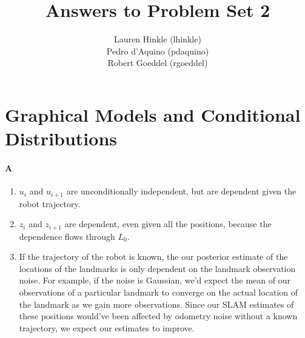 \documentclass[12pt]{article}
\title{Answers to Problem Set 2}
\author{
	Lauren Hinkle (lhinkle)\\
	Pedro d'Aquino  (pdaquino)\\
	Robert Goeddel (rgoeddel)}
\begin{document}
\maketitle
\pagebreak

\section{Graphical Models and Conditional Distributions}

\paragraph{A}
\begin{enumerate}
	\item $u_i$ and $u_{i+1}$ are unconditionally independent, but are dependent given the robot trajectory.
	\item $z_i$ and $z_{i+1}$ are dependent, even given all the positions, because the dependence flows through $L_0$.
	\item If the trajectory of the robot is known, the our posterior estimate of the locations of the
    landmarks is only dependent on the landmark observation noise. For example, if the noise is Gaussian,
    we'd expect the mean of our observations of a particular landmark to converge on the actual location
    of the landmark as we gain more observations. Since our SLAM estimates of these positions would've
    been affected by odometry noise without a known trajectory, we expect our estimates to improve.
\end{enumerate}
\end{document}
